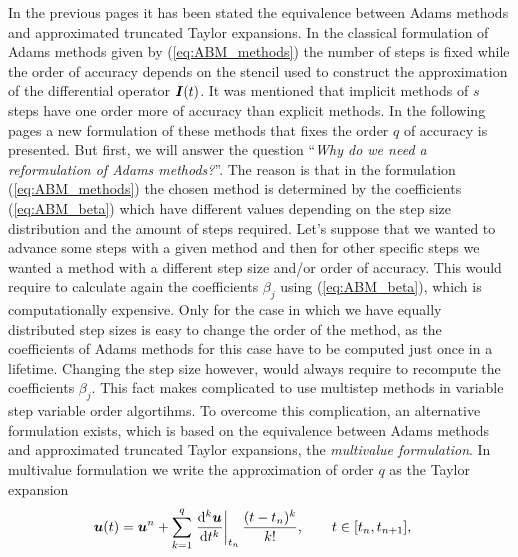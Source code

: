 In the previous pages it has been stated the equivalence between Adams methods and approximated truncated Taylor expansions. In the classical formulation of Adams methods given by (\ref{eq:ABM_methods}) the number of steps is fixed while the order of accuracy depends on the stencil used to construct the approximation of the differential operator $\boldsymbol{I}(t)$. It was mentioned that implicit methods of $s$ steps have one order more of accuracy than explicit methods. In the following pages a new formulation of these methods that fixes the order $q$ of accuracy is presented. But first, we will answer the question ``\textit{Why do we need a reformulation of Adams methods?}''. The reason is that in the formulation (\ref{eq:ABM_methods}) the chosen method is determined by the coefficients (\ref{eq:ABM_beta}) which have different values depending on the step size distribution and the amount of steps required. Let's suppose that we wanted to advance some steps with a given method and then for other specific steps we wanted a method with a different step size and/or order of accuracy. This would require to calculate again the coefficients $\beta_{j}$ using (\ref{eq:ABM_beta}), which is computationally expensive. Only for the case in which we have equally distributed step sizes is easy to change the order of the method, as the coefficients of Adams methods for this case have to be computed just once in a lifetime. Changing the step size however, would always require to recompute the coefficients $\beta_{j}$. This fact makes complicated to use multistep methods in variable step variable order algortihms. To overcome this complication, an alternative formulation exists, which is based on the equivalence between Adams methods and approximated truncated Taylor expansions, the \textit{multivalue formulation}. In multivalue formulation we write the approximation of order $q$ as the Taylor expansion
%
\begin{align}
	\vect{u}(t)
	& =
	\vect{u}^n
	+
	\sum_{k = 1}^{q}
	\eval{ \dv[k]{\vect{u}}{t} }_{t_n}
	\frac{(t-t_n)^k}{k!}
	,
	\qquad 
	t \in [t_n,t_{n+1}],
	\label{eq:Multivalue_Taylor}
\end{align}
